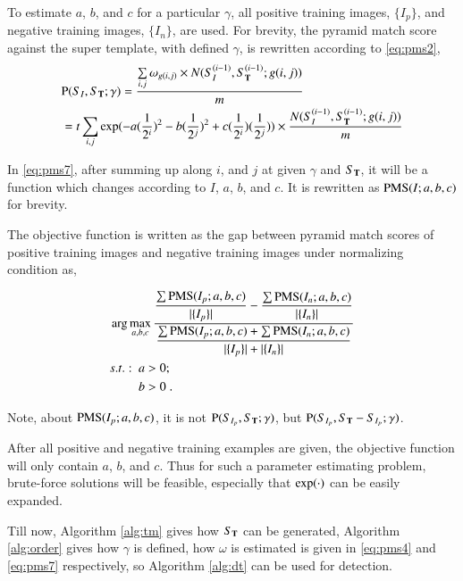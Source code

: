 \documentclass[paper]{ieice}
\begin{document}
To estimate $a$, $b$, and $c$ for a particular $\gamma$, all positive training images, $\{I_p\}$, and negative training images, $\{I_n\}$, are used. For brevity, the pyramid match score against the super template, with defined $\gamma$, is rewritten according to \ref{eq:pms2},
\begin{equation}
\begin{aligned}
&{\rm P}(S_{I},S_{\bf{T}};\gamma)=\frac{ \sum\limits_{i,j}{{\omega}_{g(i,j)}\times N(S_I^{(i-1)},S_{\bf T}^{(i-1)}; g(i,j)) }}{m}\\
&=t \sum\limits_{i,j}{  \exp(-a (\frac 1 {2^i})^2 - b (\frac 1 {2^j})^2 + c (\frac 1 {2^i}) (\frac 1 {2^j}))   \times \frac{ N(S_I^{(i-1)},S_{\bf T}^{(i-1)}; g(i,j))} m }\\
\end{aligned}
\label{eq:pms7}
\end{equation}

In \ref{eq:pms7}, after summing up along $i$, and $j$ at given $\gamma$ and $S_{\bf T}$, it will be a function which changes according to $I$, $a$, $b$, and $c$. It is rewritten as ${\rm PMS}(I;a,b,c)$ for  brevity.



The objective function is written as the gap between pyramid match scores of positive training images and negative training images under normalizing condition as,

\[\begin{aligned}
&\arg \max\limits_{a,b,c} \dfrac{ \dfrac {\sum {\rm PMS}(I_p;a,b,c)}  {|\{ I_p \}|} - \dfrac {\sum {\rm PMS}(I_n;a,b,c)}  {|\{ I_n \}|} }
{\dfrac
{{\sum {\rm PMS}(I_p;a,b,c)}+ {\sum {\rm PMS}(I_n;a,b,c) }}
{|\{ I_p \}|+|\{ I_n \}|}
}\\
&\begin{aligned}
    s.t.:\mbox{ }& a>0;\\
    &b>0\;.
\end{aligned}
\end{aligned}
\]

Note, about ${\rm PMS}(I_p;a,b,c)$, it is not ${\rm P}(S_{I_p},S_{\bf{T}};\gamma)$, but ${\rm P}(S_{I_p},S_{\bf{T}}-S_{I_p};\gamma)$.

After all positive and negative training examples are given, the objective function will only contain $a$, $b$, and $c$. Thus for such a parameter estimating problem, brute-force solutions will be feasible, especially that $\exp({\bf \cdot})$ can be easily expanded.

Till now, Algorithm \ref{alg:tm} gives how $S_{\bf T}$ can be generated,  Algorithm \ref{alg:order}  gives how $\gamma$ is defined, how $\omega$ is estimated is given in \ref{eq:pms4} and \ref{eq:pms7} respectively, so Algorithm \ref{alg:dt} can be used for detection.
\end{document}
